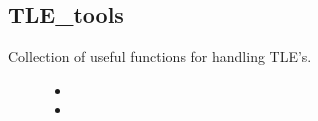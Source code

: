\documentclass[letterpaper,10pt,english]{sphinxmanual}
\begin{document}
\subsection{TLE\_tools}
\label{\detokenize{modules/TLE_tools:module-TLE_tools}}\label{\detokenize{modules/TLE_tools:tle-tools}}\label{\detokenize{modules/TLE_tools::doc}}
Collection of useful functions for handling TLE’s.
\begin{description}
\item[{}] \leavevmode\begin{itemize}
\item {} 

\item {} 

\end{itemize}

\end{description}
\end{document}
